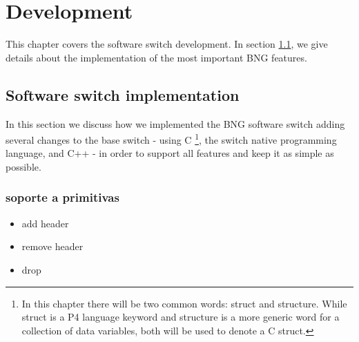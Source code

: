 \chapter{Development}
\label{cap:cap04}

This chapter covers the software switch development. In section \ref{softfeatures}, we give details about the implementation of the most important BNG features.

\section{Software switch implementation}
\label{softfeatures}

In this section we discuss how we implemented the BNG software switch adding several changes to the base switch - using C \footnote{In this chapter there will be two common words: struct and structure. While struct is a P4 language keyword and structure is a more generic word for a collection of data variables, both will be used to denote a C struct.}, the switch native programming language, and C++ - in order to support all features and keep it as simple as possible.

\subsection{soporte a primitivas}

\begin{itemize}

\item add header

\item remove header

\item drop
\end{itemize}


 